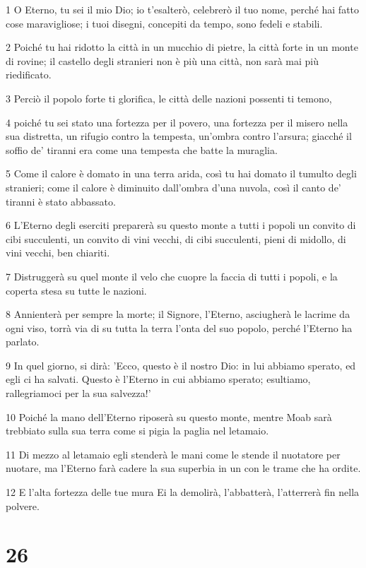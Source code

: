 \par 1 O Eterno, tu sei il mio Dio; io t'esalterò, celebrerò il tuo nome, perché hai fatto cose maravigliose; i tuoi disegni, concepiti da tempo, sono fedeli e stabili.
\par 2 Poiché tu hai ridotto la città in un mucchio di pietre, la città forte in un monte di rovine; il castello degli stranieri non è più una città, non sarà mai più riedificato.
\par 3 Perciò il popolo forte ti glorifica, le città delle nazioni possenti ti temono,
\par 4 poiché tu sei stato una fortezza per il povero, una fortezza per il misero nella sua distretta, un rifugio contro la tempesta, un'ombra contro l'arsura; giacché il soffio de' tiranni era come una tempesta che batte la muraglia.
\par 5 Come il calore è domato in una terra arida, così tu hai domato il tumulto degli stranieri; come il calore è diminuito dall'ombra d'una nuvola, così il canto de' tiranni è stato abbassato.
\par 6 L'Eterno degli eserciti preparerà su questo monte a tutti i popoli un convito di cibi succulenti, un convito di vini vecchi, di cibi succulenti, pieni di midollo, di vini vecchi, ben chiariti.
\par 7 Distruggerà su quel monte il velo che cuopre la faccia di tutti i popoli, e la coperta stesa su tutte le nazioni.
\par 8 Annienterà per sempre la morte; il Signore, l'Eterno, asciugherà le lacrime da ogni viso, torrà via di su tutta la terra l'onta del suo popolo, perché l'Eterno ha parlato.
\par 9 In quel giorno, si dirà: 'Ecco, questo è il nostro Dio: in lui abbiamo sperato, ed egli ci ha salvati. Questo è l'Eterno in cui abbiamo sperato; esultiamo, rallegriamoci per la sua salvezza!'
\par 10 Poiché la mano dell'Eterno riposerà su questo monte, mentre Moab sarà trebbiato sulla sua terra come si pigia la paglia nel letamaio.
\par 11 Di mezzo al letamaio egli stenderà le mani come le stende il nuotatore per nuotare, ma l'Eterno farà cadere la sua superbia in un con le trame che ha ordite.
\par 12 E l'alta fortezza delle tue mura Ei la demolirà, l'abbatterà, l'atterrerà fin nella polvere.

\chapter{26}

